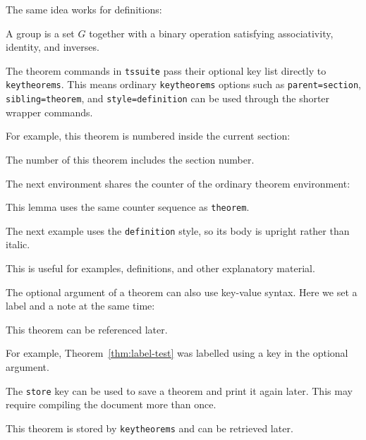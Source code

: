 \documentclass[a4paper,11pt]{article}
\newcommand{\pkg}[1]{\texttt{#1}}
\begin{document}
The same idea works for definitions:

\begin{fdefinition}[Group]
A group is a set $G$ together with a binary operation satisfying associativity,
identity, and inverses.
\end{fdefinition}

The theorem commands in \pkg{tssuite} pass their optional key list directly to
\pkg{keytheorems}.  This means ordinary \pkg{keytheorems} options such as
\verb|parent=section|, \verb|sibling=theorem|, and \verb|style=definition| can be
used through the shorter wrapper commands.

For example, this theorem is numbered inside the current section:

\begin{sectiontheorem}[note=Section-local numbering,label=thm:section-local]
The number of this theorem includes the section number.
\end{sectiontheorem}

The next environment shares the counter of the ordinary theorem environment:

\begin{sharedlemma}[note=Shared counter]
This lemma uses the same counter sequence as \verb|theorem|.
\end{sharedlemma}

The next example uses the \verb|definition| style, so its body is upright rather
than italic.

\begin{plainexample}[note=Definition-style body]
This is useful for examples, definitions, and other explanatory material.
\end{plainexample}

The optional argument of a theorem can also use key-value syntax.  Here we set a
label and a note at the same time:

\begin{theorem}[label=thm:label-test,note=A labelled theorem]
This theorem can be referenced later.
\end{theorem}

For example, Theorem~\ref{thm:label-test} was labelled using a key in the
optional argument.

The \verb|store| key can be used to save a theorem and print it again later.  This
may require compiling the document more than once.

\begin{theorem}[store=stored-demo,note=Stored theorem]
This theorem is stored by \pkg{keytheorems} and can be retrieved later.
\end{theorem}
\end{document}
